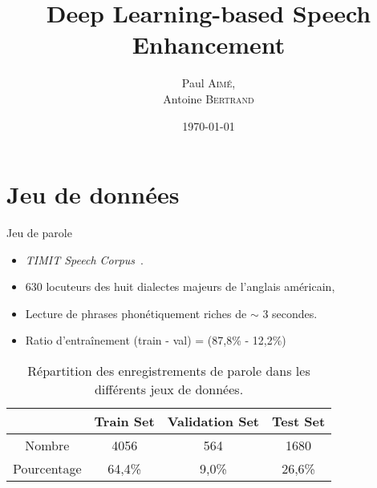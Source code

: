\documentclass{beamer}
\title[Deep Learning-based Speech Enhancement]{Deep Learning-based Speech Enhancement}
\author{Paul \textsc{Aimé}, \\ Antoine \textsc{Bertrand}}
\institute{3A SICOM EEH}
\date{\today}
\begin{document}
\begin{frame}
  \titlepage
\end{frame}










\section{Jeu de données}


\begin{frame}{Jeu de parole}

\begin{itemize}[label=$\bullet$]
    \item \textit{TIMIT Speech Corpus}~\cite{abdelaziz2017timit}.
    \item 630 locuteurs des huit dialectes majeurs de l'anglais américain,
    \item Lecture de phrases phonétiquement riches de $\sim$ 3 secondes.
    \item Ratio d'entraînement (train - val) = (87,8\% - 12,2\%)
\end{itemize}

\begin{table}[!h]
\center
\begin{tabular}{ |c|c|c|c| } 
\hline
    & Train Set & Validation Set & Test Set \\ 
    \hline
    Nombre & 4056 & 564 & 1680 \\ 
    \hline
    Pourcentage & 64,4\% & 9,0\% & 26,6\% \\
    \hline
\end{tabular}%
    \captionsetup{justification=centering,margin=2cm}
    \caption{Répartition des enregistrements de parole dans les différents jeux de données.}
    \label{tab:nb_sounds_per_database}
\end{table}

\end{frame}
\end{document}
